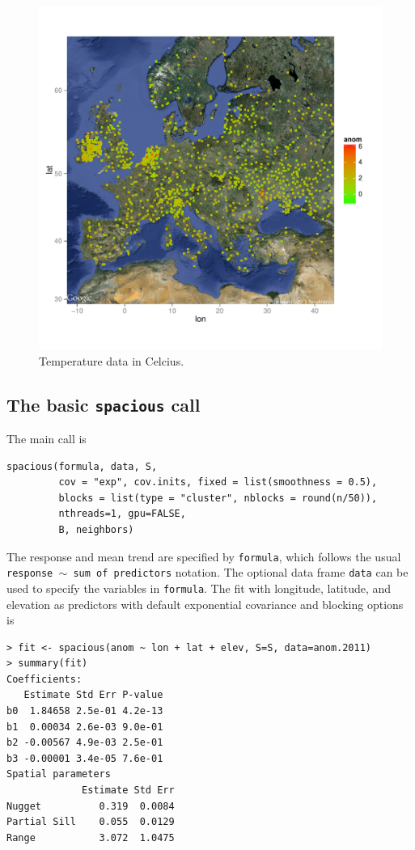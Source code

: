 \documentclass[11pt]{article}
\begin{document}
\begin{figure}
	\caption{Temperature data in Celcius.}\label{f:data}
	\centering
	\includegraphics[width=5.5in]{figures/data.pdf}
\end{figure}

\subsection{The basic {\tt spacious} call}

The main call is

\begin{verbatim}
spacious(formula, data, S,
         cov = "exp", cov.inits, fixed = list(smoothness = 0.5),
         blocks = list(type = "cluster", nblocks = round(n/50)),
         nthreads=1, gpu=FALSE,
         B, neighbors)
\end{verbatim}

The response and mean trend are specified by {\tt formula}, which follows the usual {\tt response $\sim$ sum of predictors} notation.
The optional data frame {\tt data} can be used to specify the variables in {\tt formula}.
The fit with longitude, latitude, and elevation as predictors with default exponential covariance and blocking options is

\begin{verbatim}
> fit <- spacious(anom ~ lon + lat + elev, S=S, data=anom.2011)
> summary(fit)
Coefficients:
   Estimate Std Err P-value
b0  1.84658 2.5e-01 4.2e-13
b1  0.00034 2.6e-03 9.0e-01
b2 -0.00567 4.9e-03 2.5e-01
b3 -0.00001 3.4e-05 7.6e-01
Spatial parameters
             Estimate Std Err
Nugget          0.319  0.0084
Partial Sill    0.055  0.0129
Range           3.072  1.0475
\end{verbatim}
\end{document}
